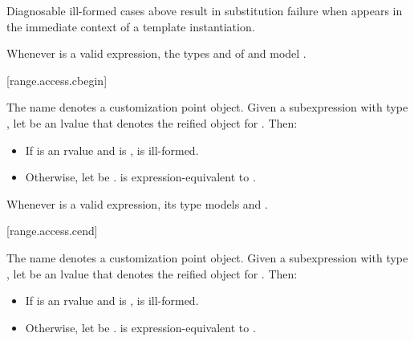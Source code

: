 \pnum
\begin{note}
Diagnosable ill-formed cases above
result in substitution failure when 
appears in the immediate context of a template instantiation.
\end{note}

\pnum
\begin{note}
Whenever  is a valid expression,
the types  and  of
 and 
model .
\end{note}

[range.access.cbegin]{}
%

\pnum
The name  denotes a customization point
object.
Given a subexpression  with type ,
let  be an lvalue that denotes the reified object for .
Then:
\begin{itemize}
\item
If  is an rvalue and
 is ,
 is ill-formed.
\item
Otherwise,
let  be .
 is expression-equivalent to
.
\end{itemize}

\pnum
\begin{note}
Whenever  is a valid expression, its type models
 and .
\end{note}

[range.access.cend]{}
%

\pnum
The name  denotes a customization point
object.
Given a subexpression  with type ,
let  be an lvalue that denotes the reified object for .
Then:
\begin{itemize}
\item
If  is an rvalue and
 is ,
 is ill-formed.
\item
Otherwise,
let  be .
 is expression-equivalent to
.
\end{itemize}


